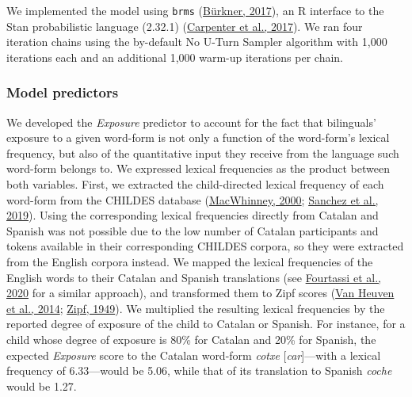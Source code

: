 \documentclass[
]{article}
\begin{document}
We implemented the model using \texttt{brms}
(\protect\hyperlink{ref-burkner2017brms}{Bürkner, 2017}), an R interface
to the Stan probabilistic language (2.32.1)
(\protect\hyperlink{ref-carpenter2017stan}{Carpenter et al., 2017}). We
ran four iteration chains using the by-default No U-Turn Sampler
algorithm with 1,000 iterations each and an additional 1,000 warm-up
iterations per chain.

\hypertarget{sec-predictors}{%
\subsubsection{Model predictors}\label{sec-predictors}}

We developed the \emph{Exposure} predictor to account for the fact that
bilinguals' exposure to a given word-form is not only a function of the
word-form's lexical frequency, but also of the quantitative input they
receive from the language such word-form belongs to. We expressed
lexical frequencies as the product between both variables. First, we
extracted the child-directed lexical frequency of each word-form from
the CHILDES database
(\protect\hyperlink{ref-macwhinney2000childes}{MacWhinney, 2000};
\protect\hyperlink{ref-sanchez2019childesdb}{Sanchez et al., 2019}).
Using the corresponding lexical frequencies directly from Catalan and
Spanish was not possible due to the low number of Catalan participants
and tokens available in their corresponding CHILDES corpora, so they
were extracted from the English corpora instead. We mapped the lexical
frequencies of the English words to their Catalan and Spanish
translations (see \protect\hyperlink{ref-fourtassi2020growth}{Fourtassi
et al., 2020} for a similar approach), and transformed them to Zipf
scores (\protect\hyperlink{ref-vanheuven2014subtlexuk}{Van Heuven et
al., 2014}; \protect\hyperlink{ref-zipf1949human}{Zipf, 1949}). We
multiplied the resulting lexical frequencies by the reported degree of
exposure of the child to Catalan or Spanish. For instance, for a child
whose degree of exposure is 80\% for Catalan and 20\% for Spanish, the
expected \emph{Exposure} score to the Catalan word-form \emph{cotxe}
{[}\emph{car}{]}---with a lexical frequency of 6.33---would be 5.06,
while that of its translation to Spanish \emph{coche} would be 1.27.
\end{document}
